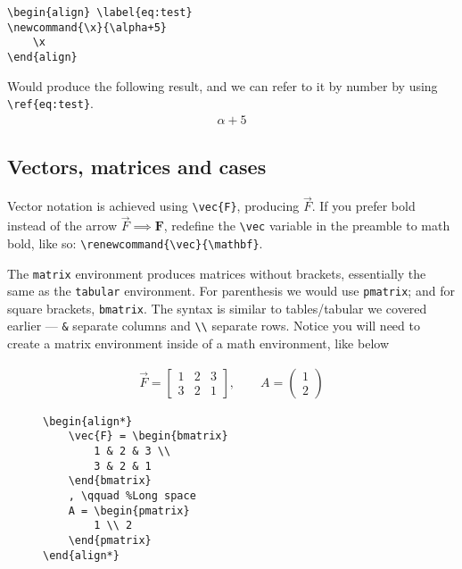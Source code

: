 \begin{lstlisting}
\begin{align} \label{eq:test}
\newcommand{\x}{\alpha+5}
    \x
\end{align}
\end{lstlisting}
Would produce the following result, and we can refer to it by number by using \verb|\ref{eq:test}|.
\begin{align}
    \alpha+5
\end{align}
\subsection{Vectors, matrices and cases}
Vector notation is achieved using \verb|\vec{F}|, producing \(\vec{F}\).
If you prefer bold instead of the arrow \( \vec{F} \implies \mathbf{F}\), redefine the \verb|\vec| variable in the preamble to math bold, like so:
\verb|\renewcommand{\vec}{\mathbf}|.

The \verb|matrix| environment produces matrices without brackets, essentially the same as the \texttt{tabular} environment.
For parenthesis we would use \texttt{pmatrix}; and for square brackets, \texttt{bmatrix}.
The syntax is similar to tables/tabular we covered earlier --- \verb|&| separate columns and \verb|\\| separate rows.
Notice you will need to create a matrix environment inside of a math environment, like below 
\begin{figure}[h] \centering
\begin{minipage}{0.45\textwidth}
    \begin{align*}
        \vec{F} = \begin{bmatrix}
            1 & 2 & 3 \\
            3 & 2 & 1 
        \end{bmatrix}
        , \qquad
        A = \begin{pmatrix}
            1 \\ 2
    \end{pmatrix}
    \end{align*}
\end{minipage}
\hfill
\begin{minipage}{0.45\textwidth}
\begin{lstlisting}
\begin{align*}
    \vec{F} = \begin{bmatrix}
        1 & 2 & 3 \\
        3 & 2 & 1 
    \end{bmatrix}
    , \qquad %Long space
    A = \begin{pmatrix}
        1 \\ 2
    \end{pmatrix} 
\end{align*}
\end{lstlisting}
\end{minipage}

\end{figure}



